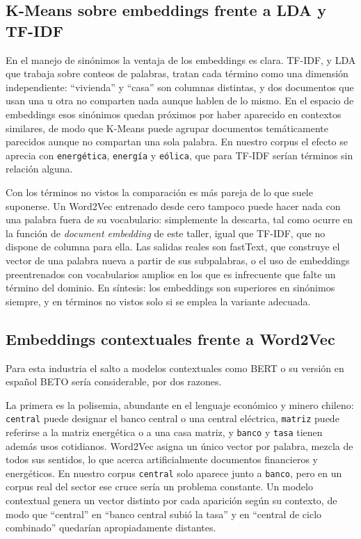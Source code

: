 \documentclass[12pt, a4paper]{article}
\newcommand{\code}[1]{\texttt{#1}}
\begin{document}
\subsection{K-Means sobre embeddings frente a LDA y TF-IDF}

En el manejo de sinónimos la ventaja de los embeddings es clara. TF-IDF, y LDA \citep{blei2003latent}
que trabaja sobre conteos de palabras, tratan cada término como una dimensión independiente:
``vivienda'' y ``casa'' son columnas distintas, y dos documentos que usan una u otra no comparten
nada aunque hablen de lo mismo. En el espacio de embeddings esos sinónimos quedan próximos por haber
aparecido en contextos similares, de modo que K-Means puede agrupar documentos temáticamente
parecidos aunque no compartan una sola palabra. En nuestro corpus el efecto se aprecia con
\code{energética}, \code{energía} y \code{eólica}, que para TF-IDF serían términos sin relación
alguna.

Con los términos no vistos la comparación es más pareja de lo que suele suponerse. Un Word2Vec
entrenado desde cero tampoco puede hacer nada con una palabra fuera de su vocabulario: simplemente la
descarta, tal como ocurre en la función de \textit{document embedding} de este taller, igual que
TF-IDF, que no dispone de columna para ella. Las salidas reales son fastText, que construye el vector
de una palabra nueva a partir de sus subpalabras, o el uso de embeddings preentrenados con
vocabularios amplios en los que es infrecuente que falte un término del dominio. En síntesis: los
embeddings son superiores en sinónimos siempre, y en términos no vistos solo si se emplea la variante
adecuada.

\subsection{Embeddings contextuales frente a Word2Vec}

Para esta industria el salto a modelos contextuales como BERT \citep{devlin2019bert} o su versión en
español BETO \citep{canete2020spanish} sería considerable, por dos razones.

La primera es la polisemia, abundante en el lenguaje económico y minero chileno: \code{central} puede
designar el banco central o una central eléctrica, \code{matriz} puede referirse a la matriz
energética o a una casa matriz, y \code{banco} y \code{tasa} tienen además usos cotidianos. Word2Vec
asigna un único vector por palabra, mezcla de todos sus sentidos, lo que acerca artificialmente
documentos financieros y energéticos. En nuestro corpus \code{central} solo aparece junto a
\code{banco}, pero en un corpus real del sector ese cruce sería un problema constante. Un modelo
contextual genera un vector distinto por cada aparición según su contexto, de modo que ``central'' en
``banco central subió la tasa'' y en ``central de ciclo combinado'' quedarían apropiadamente
distantes.
\end{document}
